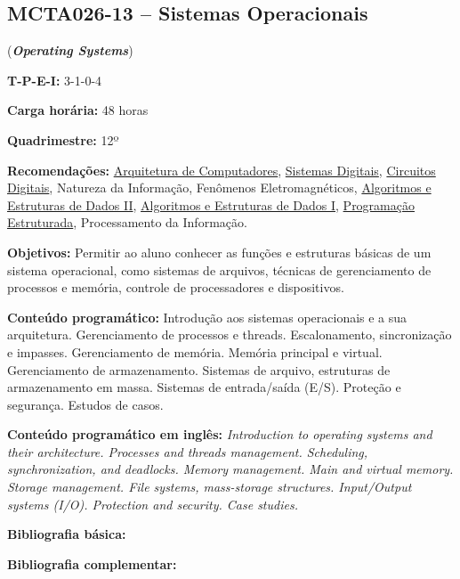 \documentclass[class=article, crop=false]{standalone}
\begin{document}
\subsection*{MCTA026-13 -- Sistemas Operacionais}
\label{disc:so}

(\textbf{\textit{Operating Systems}})

\begin{center}
\begin{minipage}{0.85\textwidth}
    \textbf{T-P-E-I:} 3-1-0-4
    
    \textbf{Carga horária:} 48 horas
    
    \textbf{Quadrimestre:} 12º
    
    \textbf{Recomendações:} 
    \hyperref[disc:arq]{Arquitetura de Computadores},
    \hyperref[disc:sist_dig]{Sistemas Digitais},
    \hyperref[disc:circ_dig]{Circuitos Digitais},
    Natureza da Informação, 
    Fenômenos Eletromagnéticos,
    \hyperref[disc:aedII]{Algoritmos e Estruturas de Dados II},
    \hyperref[disc:aedI]{Algoritmos e Estruturas de Dados I},
    \hyperref[disc:pe]{Programação Estruturada}, 
    Processamento da Informação.
\end{minipage}
\end{center}

\textbf{Objetivos:}
Permitir ao aluno conhecer as funções e estruturas básicas de um sistema
operacional, como sistemas de arquivos, técnicas de gerenciamento de processos
e memória, controle de processadores e dispositivos. 

\textbf{Conteúdo programático:}
Introdução aos sistemas operacionais e a sua arquitetura. 
Gerenciamento de processos e threads.
Escalonamento, sincronização e impasses.
Gerenciamento de memória. 
Memória principal e virtual. 
Gerenciamento de armazenamento. 
Sistemas de arquivo, estruturas de armazenamento em massa. 
Sistemas de entrada/saída (E/S). 
Proteção e segurança. 
Estudos de casos.

\textbf{Conteúdo programático em inglês:}
\textit{Introduction to operating systems and their architecture. 
Processes and threads management. 
Scheduling, synchronization, and deadlocks. 
Memory management. 
Main and virtual memory. 
Storage management. 
File systems, mass-storage structures. 
Input/Output systems (I/O). 
Protection and security. 
Case studies.}


\newrefsection
\textbf{Bibliografia básica:}
\nocite{2010-silberschatz, 2016-tanenbaum, 2005-deitel}
\printbibliography

\newrefsection
\textbf{Bibliografia complementar:}
\nocite{2018-flynn, 2009-stallings, 2005-bovet, 2008-tanenbaum, 2004-oliveira}
\printbibliography
\end{document}
